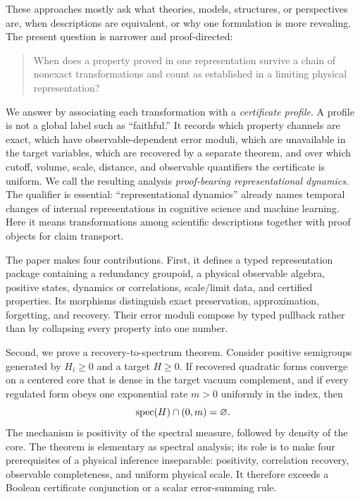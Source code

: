 These approaches mostly ask what theories, models, structures, or
perspectives are, when descriptions are equivalent, or why one formulation
is more revealing.  The present question is narrower and proof-directed:

\begin{quote}
When does a property proved in one representation survive a chain of
nonexact transformations and count as established in a limiting physical
representation?
\end{quote}

We answer by associating each transformation with a \emph{certificate
profile}.  A profile is not a global label such as ``faithful.''  It records
which property channels are exact, which have observable-dependent error
moduli, which are unavailable in the target variables, which are recovered by
a separate theorem, and over which cutoff, volume, scale, distance, and
observable quantifiers the certificate is uniform.  We call the resulting
analysis \emph{proof-bearing representational dynamics}.  The qualifier is
essential: ``representational dynamics'' already names temporal changes of
internal representations in cognitive science and machine learning.  Here it
means transformations among scientific descriptions together with proof
objects for claim transport.

The paper makes four contributions.  First, it defines a typed representation
package containing a redundancy groupoid, a physical observable algebra,
positive states, dynamics or correlations, scale/limit data, and certified
properties.  Its morphisms distinguish exact preservation, approximation,
forgetting, and recovery.  Their error moduli compose by typed pullback rather
than by collapsing every property into one number.

Second, we prove a recovery-to-spectrum theorem.  Consider positive
semigroups generated by $H_i\geq0$ and a target $H\geq0$.  If recovered
quadratic forms converge on a centered core that is dense in the target
vacuum complement, and if every regulated form obeys one exponential rate
$m>0$ uniformly in the index, then
\[
  \operatorname{spec}(H)\cap(0,m)=\varnothing.
\]
The mechanism is positivity of the spectral measure, followed by density of
the core.  The theorem is elementary as spectral analysis; its role is to
make four prerequisites of a physical inference inseparable: positivity,
correlation recovery, observable completeness, and uniform physical scale.
It therefore exceeds a Boolean certificate conjunction or a scalar
error-summing rule.

